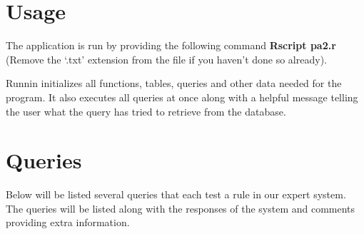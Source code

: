 \section{Usage} \label{man-usage}
The application is run by providing the following command \textbf{Rscript pa2.r}
(Remove the `.txt' extension from the file if you haven't done so already).

Runnin initializes all functions, tables, queries and other data needed for the
program. It also executes all queries at once along with a helpful message
telling the user what the query has tried to retrieve from the database.

\newpage
\section{Queries} \label{man-queries}
Below will be listed several queries that each test a rule in our expert system.
The queries will be listed along with the responses of the system and comments
providing extra information.

%
%
%
%
